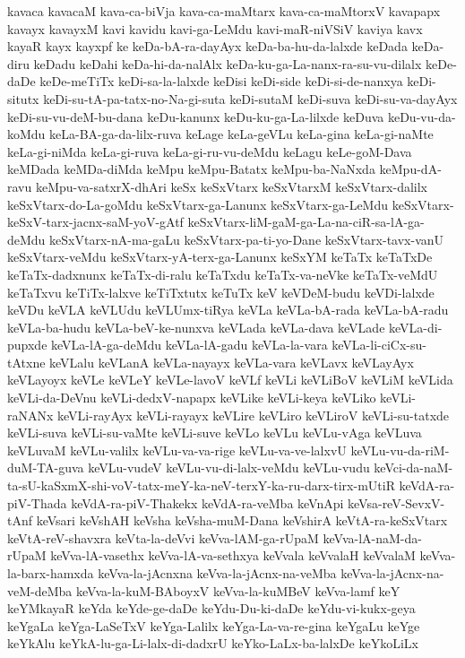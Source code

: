 {kavaca
kavacaM
kava-ca-biVja
kava-ca-maMtarx
kava-ca-maMtorxV
kavapapx
kavayx
kavayxM
kavi
kavidu
kavi-ga-LeMdu
kavi-maR-niVSiV
kaviya
kavx
kayaR
kayx
kayxpf
ke
keDa-bA-ra-dayAyx
keDa-ba-hu-da-lalxde
keDada
keDa-diru
keDadu
keDahi
keDa-hi-da-nalAlx
keDa-ku-ga-La-nanx-ra-su-vu-dilalx
keDe-daDe
keDe-meTiTx
keDi-sa-la-lalxde
keDisi
keDi-side
keDi-si-de-nanxya
keDi-situtx
keDi-su-tA-pa-tatx-no-Na-gi-suta
keDi-sutaM
keDi-suva
keDi-su-va-dayAyx
keDi-su-vu-deM-bu-dana
keDu-kanunx
keDu-ku-ga-La-lilxde
keDuva
keDu-vu-da-koMdu
keLa-BA-ga-da-lilx-ruva
keLage
keLa-geVLu
keLa-gina
keLa-gi-naMte
keLa-gi-niMda
keLa-gi-ruva
keLa-gi-ru-vu-deMdu
keLagu
keLe-goM-Dava
keMDada
keMDa-diMda
keMpu
keMpu-Batatx
keMpu-ba-NaNxda
keMpu-dA-ravu
keMpu-va-satxrX-dhAri
keSx
keSxVtarx
keSxVtarxM
keSxVtarx-dalilx
keSxVtarx-do-La-goMdu
keSxVtarx-ga-Lanunx
keSxVtarx-ga-LeMdu
keSxVtarx-keSxV-tarx-jacnx-saM-yoV-gAtf
keSxVtarx-liM-gaM-ga-La-na-ciR-sa-lA-ga-deMdu
keSxVtarx-nA-ma-gaLu
keSxVtarx-pa-ti-yo-Dane
keSxVtarx-tavx-vanU
keSxVtarx-veMdu
keSxVtarx-yA-terx-ga-Lanunx
keSxYM
keTaTx
keTaTxDe
keTaTx-dadxnunx
keTaTx-di-ralu
keTaTxdu
keTaTx-va-neVke
keTaTx-veMdU
keTaTxvu
keTiTx-lalxve
keTiTxtutx
keTuTx
keV
keVDeM-budu
keVDi-lalxde
keVDu
keVLA
keVLUdu
keVLUmx-tiRya
keVLa
keVLa-bA-rada
keVLa-bA-radu
keVLa-ba-hudu
keVLa-beV-ke-nunxva
keVLada
keVLa-dava
keVLade
keVLa-di-pupxde
keVLa-lA-ga-deMdu
keVLa-lA-gadu
keVLa-la-vara
keVLa-li-ciCx-su-tAtxne
keVLalu
keVLanA
keVLa-nayayx
keVLa-vara
keVLavx
keVLayAyx
keVLayoyx
keVLe
keVLeY
keVLe-lavoV
keVLf
keVLi
keVLiBoV
keVLiM
keVLida
keVLi-da-DeVnu
keVLi-dedxV-napapx
keVLike
keVLi-keya
keVLiko
keVLi-raNANx
keVLi-rayAyx
keVLi-rayayx
keVLire
keVLiro
keVLiroV
keVLi-su-tatxde
keVLi-suva
keVLi-su-vaMte
keVLi-suve
keVLo
keVLu
keVLu-vAga
keVLuva
keVLuvaM
keVLu-valilx
keVLu-va-va-rige
keVLu-va-ve-lalxvU
keVLu-vu-da-riM-duM-TA-guva
keVLu-vudeV
keVLu-vu-di-lalx-veMdu
keVLu-vudu
keVci-da-naM-ta-sU-kaSxmX-shi-voV-tatx-meY-ka-neV-terxY-ka-ru-darx-tirx-mUtiR
keVdA-ra-piV-Thada
keVdA-ra-piV-Thakekx
keVdA-ra-veMba
keVnApi
keVsa-reV-SevxV-tAnf
keVsari
keVshAH
keVsha
keVsha-muM-Dana
keVshirA
keVtA-ra-keSxVtarx
keVtA-reV-shavxra
keVta-la-deVvi
keVva-lAM-ga-rUpaM
keVva-lA-naM-da-rUpaM
keVva-lA-vasethx
keVva-lA-va-sethxya
keVvala
keVvalaH
keVvalaM
keVva-la-barx-hamxda
keVva-la-jAcnxna
keVva-la-jAcnx-na-veMba
keVva-la-jAcnx-na-veM-deMba
keVva-la-kuM-BAboyxV
keVva-la-kuMBeV
keVva-lamf
keY
keYMkayaR
keYda
keYde-ge-daDe
keYdu-Du-ki-daDe
keYdu-vi-kukx-geya
keYgaLa
keYga-LaSeTxV
keYga-Lalilx
keYga-La-va-re-gina
keYgaLu
keYge
keYkAlu
keYkA-lu-ga-Li-lalx-di-dadxrU
keYko-LaLx-ba-lalxDe
keYkoLiLx
}
